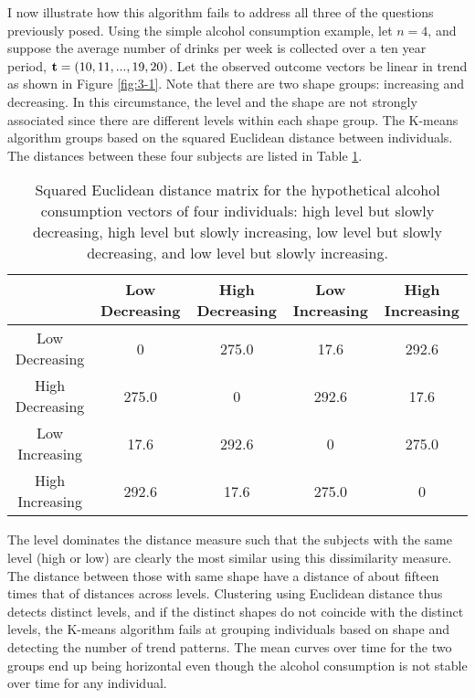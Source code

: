 I now illustrate how this algorithm fails to address all three of the questions previously posed. Using the simple alcohol consumption example, let $n=4$, and suppose the average number of drinks per week is collected over a ten year period, $\mathbf t=(10,11,...,19,20)$. Let the observed outcome vectors be linear in trend as shown in Figure \ref{fig:3-1}. Note that there are two shape groups: increasing and decreasing. In this circumstance, the level and the shape are not strongly associated since there are different levels within each shape group. The K-means algorithm groups based on the squared Euclidean distance between individuals. The distances between these four subjects are listed in Table \ref{tab:3-1}. 
\begin{table}[h]
\begin{center}
\begin{tabular}{c|cccc}
&Low Decreasing& High Decreasing&Low Increasing&High Increasing\\
\hline
Low Decreasing&0&275.0&17.6&292.6\\
High Decreasing&275.0  &0 &  292.6 &17.6 \\                     
Low Increasing& 17.6 &292.6  &0   &275.0   \\          
High Increasing& 292.6 &17.6 &275.0   &0 
\end{tabular}
\end{center}
\caption{Squared Euclidean distance matrix for the hypothetical alcohol consumption vectors of four individuals: high level but slowly decreasing, high level but slowly increasing, low level but slowly decreasing, and low level but slowly increasing. }
\label{tab:3-1}
\end{table}

The level dominates the distance measure such that the subjects with the same level (high or low) are clearly the most similar using this dissimilarity measure. The distance between those with same shape have a distance of about fifteen times that of distances across levels. Clustering using Euclidean distance thus detects distinct levels, and if the distinct shapes do not coincide with the distinct levels, the K-means algorithm fails at grouping individuals based on shape and detecting the number of trend patterns. The mean curves over time for the two groups end up being horizontal even though the alcohol consumption is not stable over time for any individual.

